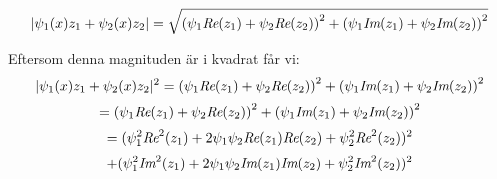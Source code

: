\documentclass{article}
\begin{document}
$$
|\psi_1(x)z_1 + \psi_2(x)z_2| = \sqrt{ \left( \psi_1 \emph{Re}(z_1) + \psi_2 \emph{Re}(z_2) \right)^2 + \left( \psi_1 \emph{Im}(z_1) + \psi_2 \emph{Im}(z_2) \right)^2 }
$$

Eftersom denna magnituden är i kvadrat får vi:
$$
|\psi_1(x)z_1 + \psi_2(x)z_2|^2 = \left( \psi_1 \emph{Re}(z_1) + \psi_2 \emph{Re}(z_2) \right)^2 + \left( \psi_1 \emph{Im}(z_1) + \psi_2 \emph{Im}(z_2) \right)^2 
$$
$$
= \left( \psi_1 \emph{Re}(z_1) + \psi_2 \emph{Re}(z_2) \right)^2 + \left( \psi_1 \emph{Im}(z_1) + \psi_2 \emph{Im}(z_2) \right)^2 
$$
$$
= ( \psi_1^2 \emph{Re}^2(z_1) + 2\psi_1 \psi_2 \emph{Re}(z_1)\emph{Re}(z_2) + \psi_2^2 \emph{Re}^2(z_2) )^2 
$$
$$
+ ( \psi_1^2 \emph{Im}^2(z_1) + 2\psi_1 \psi_2 \emph{Im}(z_1)\emph{Im}(z_2) + \psi_2^2 \emph{Im}^2(z_2) )^2 
$$
\end{document}

